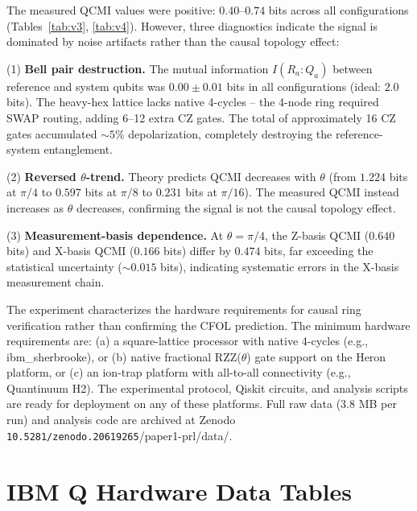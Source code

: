 \documentclass[aps,prl,superscriptaddress,nofootinbib]{revtex4-2}
\begin{document}
The measured QCMI values were positive: $0.40$--$0.74$ bits across all configurations (Tables~\ref{tab:v3}, \ref{tab:v4}). However, three diagnostics indicate the signal is dominated by noise artifacts rather than the causal topology effect:

(1) \textbf{Bell pair destruction.} The mutual information $I(R_a:Q_a)$ between reference and system qubits was $0.00\pm0.01$ bits in all configurations (ideal: $2.0$ bits). The heavy-hex lattice lacks native 4-cycles -- the 4-node ring required SWAP routing, adding 6--12 extra CZ gates. The total of approximately 16 CZ gates accumulated $\sim5\%$ depolarization, completely destroying the reference-system entanglement.

(2) \textbf{Reversed $\theta$-trend.} Theory predicts QCMI decreases with $\theta$ (from $1.224$ bits at $\pi/4$ to $0.597$ bits at $\pi/8$ to $0.231$ bits at $\pi/16$). The measured QCMI instead increases as $\theta$ decreases, confirming the signal is not the causal topology effect.

(3) \textbf{Measurement-basis dependence.} At $\theta=\pi/4$, the Z-basis QCMI ($0.640$ bits) and X-basis QCMI ($0.166$ bits) differ by $0.474$ bits, far exceeding the statistical uncertainty ($\sim0.015$ bits), indicating systematic errors in the X-basis measurement chain.

The experiment characterizes the hardware requirements for causal ring verification rather than confirming the CFOL prediction. The minimum hardware requirements are: (a) a square-lattice processor with native 4-cycles (e.g., ibm\_sherbrooke), or (b) native fractional RZZ($\theta$) gate support on the Heron platform, or (c) an ion-trap platform with all-to-all connectivity (e.g., Quantinuum H2). The experimental protocol, Qiskit circuits, and analysis scripts are ready for deployment on any of these platforms. Full raw data (3.8 MB per run) and analysis code are archived at Zenodo \texttt{10.5281/zenodo.20619265}/paper1-prl/data/.

\newpage
\section{IBM Q Hardware Data Tables}
\end{document}
